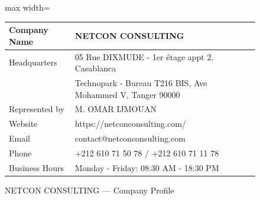 \documentclass[a4paper,12pt]{report}
\begin{document}
\begin{doublespace}
\begin{figure}[H]
    \centering
    \begin{adjustbox}{max width=\textwidth}
    \begin{tabular}{|p{}|p{}|}
      \hline
      Company Name & NETCON CONSULTING \\
      \hline
        Headquarters & 05 Rue DIXMUDE - 1er étage appt 2, Casablanca \\
        & Technopark - Bureau T216 BIS, Ave Mohammed V, Tanger 90000 \\
        \hline
        Represented by & M. OMAR IJMOUAN  \\
        \hline
        Website & https://netconconsulting.com/ \\
        \hline
        Email & contact@netconconsulting.com \\
        \hline
        Phone & +212 610 71 50 78 / +212 610 71 11 78 \\
        \hline
        Business Hours & Monday - Friday: 08:30 AM - 18:30 PM \\
      \hline
    \end{tabular}
    \end{adjustbox}
    \caption{NETCON CONSULTING — Company Profile}
\end{figure}

\end{doublespace}
\end{document}
